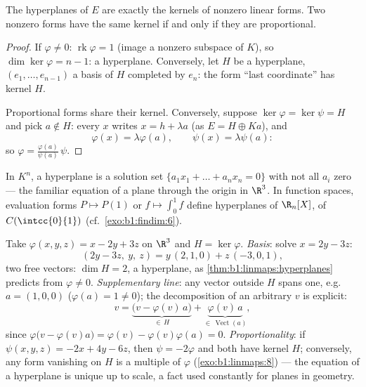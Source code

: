 \begin{theorem}\label{thm:b1:linmaps:hyperplanes}
The hyperplanes of $E$ are exactly the kernels of nonzero linear
forms. Two nonzero forms have the same kernel if and only if they
are proportional.
\end{theorem}

\begin{proof}
If $\varphi \neq 0$: $\operatorname{rk}\varphi = 1$ (image a nonzero
subspace of $K$), so $\dim\ker\varphi = n - 1$: a hyperplane.
Conversely, let $H$ be a hyperplane, $(e_1, \dots, e_{n-1})$ a basis
of $H$ completed by $e_n$: the form ``last coordinate'' has kernel
$H$.

Proportional forms share their kernel. Conversely, suppose
$\ker\varphi = \ker\psi = H$ and pick $a \notin H$: every $x$ writes
$x = h + \lambda a$ (as $E = H \oplus Ka$), and
\[
\varphi(x) = \lambda \varphi(a), \qquad \psi(x) = \lambda\psi(a):
\]
so $\varphi = \frac{\varphi(a)}{\psi(a)}\,\psi$.
\end{proof}

\begin{example}\label{ex:b1:linmaps:hyperplane}
In $K^n$, a hyperplane is a solution set $\{a_1 x_1 + \dots + a_n
x_n = 0\}$ with not all $a_i$ zero --- the familiar equation of a
plane through the origin in $\R^3$. In function spaces, evaluation
forms $P \mapsto P(1)$ or $f \mapsto \int_0^1 f$ define hyperplanes
of $\R_n[X]$, of $C(\intcc{0}{1})$ (cf.\ \cref{exo:b1:findim:6}).
\end{example}

\begin{example}
\label{ex:b1:linmaps:hyperplanerun}
Take $\varphi(x, y, z) = x - 2y + 3z$ on $\R^3$ and $H =
\ker\varphi$. \emph{Basis}: solve $x = 2y - 3z$:
\[
(2y - 3z,\ y,\ z) = y\,(2, 1, 0) + z\,(-3, 0, 1),
\]
two free vectors: $\dim H = 2$, a hyperplane, as
\cref{thm:b1:linmaps:hyperplanes} predicts from $\varphi \neq
0$. \emph{Supplementary line}: any vector outside $H$ spans one,
e.g.\ $a = (1, 0, 0)$ ($\varphi(a) = 1 \neq 0$); the
decomposition of an arbitrary $v$ is explicit:
\[
v = \underbrace{\bigl(v - \varphi(v)\,a\bigr)}_{\in\,H}
+ \underbrace{\varphi(v)\,a}_{\in\,\operatorname{Vect}(a)},
\]
since $\varphi\bigl(v - \varphi(v)a\bigr) = \varphi(v) -
\varphi(v)\varphi(a) = 0$. \emph{Proportionality}: if $\psi(x,y,z)
= -2x + 4y - 6z$, then $\psi = -2\varphi$ and both have kernel
$H$; conversely, any form vanishing on $H$ is a multiple of
$\varphi$ (\cref{exo:b1:linmaps:8}) --- the equation of a
hyperplane is unique up to scale, a fact used constantly for
planes in geometry.
\end{example}

